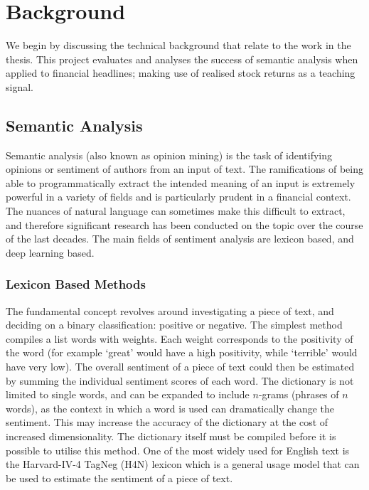 \documentclass[ oneside,%
                    author={Joshua Felmeden},
                    degree={MEng},
                     title={Semantic Analysis of Financial Headlines Based on Realised Stock Returns},
                  subtitle={}]{dissertation}
\begin{document}

\chapter{Background}
\label{chap:technical}

We begin by discussing the technical background that relate to the work in the thesis. This project evaluates and analyses the success of semantic analysis when applied to financial headlines; making use of realised stock returns as a teaching signal.

\section{Semantic Analysis}
Semantic analysis (also known as opinion mining) is the task of identifying opinions or sentiment of authors from an input of text. The ramifications of being able to programmatically extract the intended meaning of an input is extremely powerful in a variety of fields and is particularly prudent in a financial context. The nuances of natural language can sometimes make this difficult to extract, and therefore significant research has been conducted on the topic over the course of the last decades. The main fields of sentiment analysis are lexicon based, and deep learning based.


\subsection{Lexicon Based Methods}
The fundamental concept revolves around investigating a piece of text, and deciding on a binary classification: positive or negative. The simplest method compiles a list words with weights. Each weight corresponds to the positivity of the word (for example `great' would have a high positivity, while `terrible' would have very low). The overall sentiment of a piece of text could then be estimated by summing the individual sentiment scores of each word. The dictionary is not limited to single words, and can be expanded to include $n$-grams (phrases of $n$ words), as the context in which a word is used can dramatically change the sentiment. This may increase the accuracy of the dictionary at the cost of increased dimensionality. The dictionary itself must be compiled before it is possible to utilise this method. One of the most widely used for English text is the Harvard-IV-4 TagNeg (H4N) lexicon which is a general usage model that can be used to estimate the sentiment of a piece of text.
\end{document}

